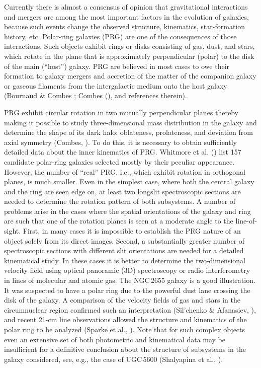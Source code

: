 \documentclass{ab}
\begin{document}
Currently there is almost a consensus of opinion that gravitational interactions and mergers are among the most important factors in the evolution of galaxies, because such events change the observed structure, kinematics, star-formation history, etc. Polar-ring galaxies (PRG) are one of the consequences of those interactions. Such objects exhibit rings or disks consisting of gas, dust, and stars, which rotate in the plane that is approximately perpendicular (polar) to the disk of the main (``host'') galaxy. PRG are believed in most cases to owe their formation to galaxy mergers and accretion of the matter of the companion galaxy or gaseous filaments from the
intergalactic medium onto the host galaxy (Bournaud \& Combes \cite{bc03:Moiseev_n}; Combes (\cite{comb06:Moiseev_n}), and references therein).

PRG exhibit circular rotation in two mutually perpendicular planes thereby making it possible to study three-dimensional mass distribution in the galaxy
and determine the shape of its dark halo: oblateness, prolateness, and deviation from axial symmetry (Combes, \cite{comb06:Moiseev_n}). To do this, it is necessary to obtain sufficiently detailed data about the inner kinematics of PRG. Whitmore et al. (\cite{w90:Moiseev_n}) list 157 candidate polar-ring galaxies
selected mostly by their peculiar appearance. However, the number of ``real'' PRG, i.e., which exhibit rotation in orthogonal planes, is much smaller. Even
in the simplest case, where both the central galaxy and the ring are seen edge on, at least two longslit spectroscopic sections are needed to determine
the rotation pattern of both subsystems. A number of problems arise in the cases where the spatial orientations of the galaxy and ring are such that one of the rotation planes is seen at a moderate angle to the line-of-sight. First, in many cases it is impossible to establish the PRG nature of an object solely from its direct images. Second, a substantially greater number of spectroscopic sections with different slit orientations  are needed for a detailed kinematical study. In these cases it is better to determine the two-dimensional velocity field using optical panoramic (3D) spectroscopy or radio interferometry in lines of molecular and atomic gas.  The NGC\,2655 galaxy is a good illustration. It was suspected to have a polar ring due to the powerful dust
lane crossing the disk of the galaxy. A comparison of the velocity fields of gas and stars in the circumnuclear  region confirmed such an interpretation (Sil'chenko \& Afanasiev, \cite{silafan04:Moiseev_n}), and recent 21-cm line observations allowed the structure and kinematics of the polar ring to be analyzed (Sparke et al., \cite{sparke08:Moiseev_n}). Note that for such complex objects even an extensive set of both photometric and kinematical data may be insufficient for a definitive conclusion about the structure of subsystems in the galaxy considered, see, e.g., the case of UGC\,5600 (Shalyapina et al., \cite{labuda07:Moiseev_n}).
\end{document}
